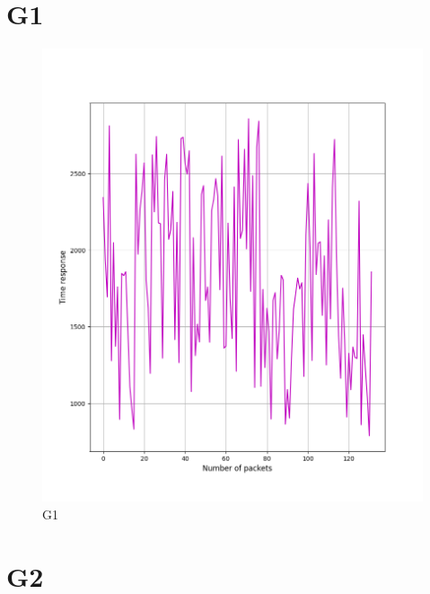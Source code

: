 \documentclass[hidelinks, 12pt, a4paper]{article}
\begin{document}



\pagebreak
\tableofcontents
\pagebreak



\section{G1}

\begin{figure}[h!]
\centering
	\includegraphics[height=.5\textheight, width=\textwidth]{assets/session1/g1.png}
	\caption{G1} 
\end{figure}

\section{G2}
\end{document}
